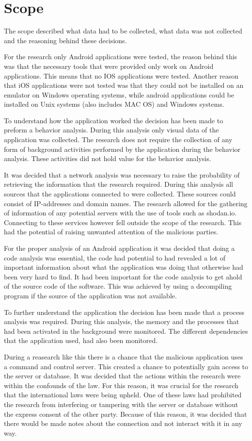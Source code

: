 \section{Scope}

The scope described what data had to be collected, what data was not collected and the reasoning behind these decisions.

For the research only Android applications were tested, the reason behind this was that the necessary tools that were provided only work on Android applications. 
This means that no IOS applications were tested. 
Another reason that iOS applications were not tested was that they could not be installed on an emulator on Windows operating systems, 
while android applications could be installed on Unix systems (also includes MAC OS) and Windows systems.

To understand how the application worked the decision has been made to preform a behavior analysis. 
During this analysis only visual data of the application was collected. 
The research does not require the collection of any form of background activities performed by the application during the behavior analysis. 
These activities did not hold value for the behavior analysis.

It was decided that a network analysis was necessary to raise the probability of retrieving the information that the research required. 
During this analysis all sources that the applications connected to were collected. These sources could consist of IP-addresses and domain names. 
The research allowed for the gathering of information of any potential servers with the use of tools such as shodan.io. 
Connecting to these services however fell outside the scope of the research. This had the potential of raising unwanted attention of the malicious parties.

For the proper analysis of an Android application it was decided that doing a code analysis was essential, 
the code had potential to had revealed a lot of important information about what the application was doing that otherwise had been very hard to find. 
It had been important for the code analysis to get ahold of the source code of the software. 
This was achieved by using a decompiling program if the source of the application was not available.

To further understand the application the decision has been made that a process analysis was required. 
During this analysis, the memory and the processes that had been activated in the background were monitored. 
The different dependencies that the application used, had also been monitored.

During a reasearch like this there is a chance that the malicious application uses a command and control server. 
This created a chance to potentially gain access to the server or database. It was decided that the actions within the research were within the confounds of the law. 
For this reason, it was crucial for the research that the international laws were being upheld. 
One of these laws had prohibited the research from interfering or tampering with the server or database without the express consent of the other party. 
Because of this reason, it was decided that there would be made notes about the connection and not interact with it in any way.